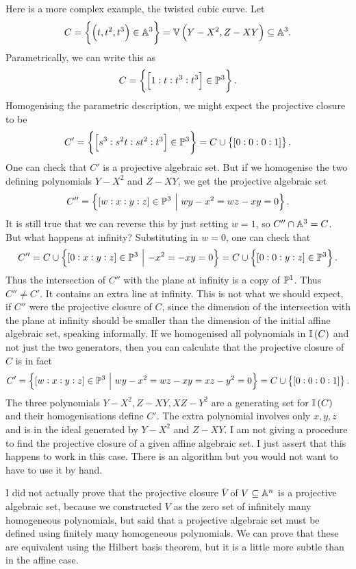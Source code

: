 \begin{example*}
Here is a more complex example, the twisted cubic curve. Let
$$ C = \cbr{\br{t, t^2, t^3} \in \AA^3} = \VV\br{Y - X^2, Z - XY} \subseteq \AA^3. $$
Parametrically, we can write this as
$$ C = \cbr{\sbr{1 : t : t^3 : t^3} \in \PP^3}. $$
Homogenising the parametric description, we might expect the projective closure to be
$$ C' = \cbr{\sbr{s^3 : s^2t : st^2 : t^3} \in \PP^3} = C \cup \cbr{\sbr{0 : 0 : 0 : 1}}. $$
One can check that $ C' $ is a projective algebraic set. But if we homogenise the two defining polynomials $ Y - X^2 $ and $ Z - XY $, we get the projective algebraic set
$$ C'' = \cbr{\sbr{w : x : y : z} \in \PP^3 \st wy - x^2 = wz - xy = 0}. $$
It is still true that we can reverse this by just setting $ w = 1 $, so $ C'' \cap \AA^3 = C $. But what happens at infinity? Substituting in $ w = 0 $, one can check that
$$ C'' = C \cup \cbr{\sbr{0 : x : y : z} \in \PP^3 \st -x^2 = -xy = 0} = C \cup \cbr{\sbr{0 : 0 : y : z} \in \PP^3}. $$
Thus the intersection of $ C'' $ with the plane at infinity is a copy of $ \PP^1 $. Thus $ C'' \ne C' $. It contains an extra line at infinity. This is not what we should expect, if $ C'' $ were the projective closure of $ C $, since the dimension of the intersection with the plane at infinity should be smaller than the dimension of the initial affine algebraic set, speaking informally. If we homogenised all polynomials in $ \II\br{C} $ and not just the two generators, then you can calculate that the projective closure of $ C $ is in fact
$$ C' = \cbr{\sbr{w : x : y : z} \in \PP^3 \st wy - x^2 = wz - xy = xz - y^2 = 0} = C \cup \cbr{\sbr{0 : 0 : 0 : 1}}. $$
The three polynomials $ Y - X^2, Z - XY, XZ - Y^2 $ are a generating set for $ \II\br{C} $ and their homogenisations define $ C' $. The extra polynomial involves only $ x, y, z $ and is in the ideal generated by $ Y - X^2 $ and $ Z - XY $. I am not giving a procedure to find the projective closure of a given affine algebraic set. I just assert that this happens to work in this case. There is an algorithm but you would not want to have to use it by hand.
\end{example*}

\pagebreak

I did not actually prove that the projective closure $ \overline{V} $ of $ V \subseteq \AA^n $ is a projective algebraic set, because we constructed $ V $ as the zero set of infinitely many homogeneous polynomials, but said that a projective algebraic set must be defined using finitely many homogeneous polynomials. We can prove that these are equivalent using the Hilbert basis theorem, but it is a little more subtle than in the affine case.

